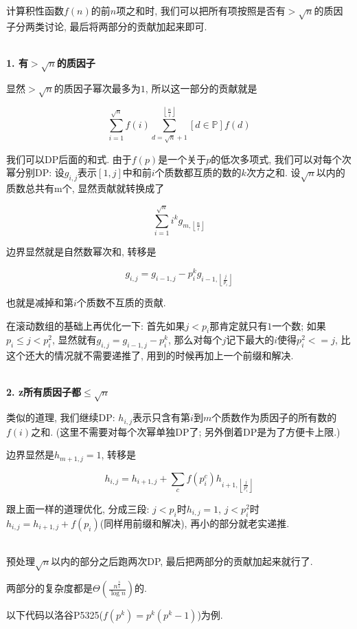 计算积性函数$f(n)$的前$n$项之和时, 我们可以把所有项按照是否有$> \sqrt n$的质因子分两类讨论, 最后将两部分的贡献加起来即可.

~\\

\textbf{1. 有$> \sqrt n$的质因子}

显然$> \sqrt n$的质因子幂次最多为$1$, 所以这一部分的贡献就是

$$ \sum_{i = 1} ^ {\sqrt n} f(i) \sum_{d = \sqrt n + 1} ^ {\left\lfloor \frac n i \right\rfloor} \left[ d \in \mathbb{P} \right] f(d) $$

我们可以DP后面的和式. 由于$f(p)$是一个关于$p$的低次多项式, 我们可以对每个次幂分别DP: 设$g_{i, j}$表示$[1, j]$中和前$i$个质数都互质的数的$k$次方之和. 设$\sqrt n$以内的质数总共有m个, 显然贡献就转换成了

$$ \sum_{i = 1} ^ {\sqrt n} i ^ k g_{m, \left\lfloor \frac n i \right\rfloor} $$

边界显然就是自然数幂次和, 转移是

$$ g_{i, j} = g_{i - 1, j} - p_i ^ k g_{i - 1, \left\lfloor \frac j {p_i} \right\rfloor} $$

也就是减掉和第$i$个质数不互质的贡献.

在滚动数组的基础上再优化一下: 首先如果$j < p_i$那肯定就只有$1$一个数; 如果$p_i \le j < p_i ^ 2$, 显然就有$g_{i, j} = g_{i - 1, j} - p_i ^ k$, 那么对每个$j$记下最大的$i$使得$p_i ^ 2 <= j$, 比这个还大的情况就不需要递推了, 用到的时候再加上一个前缀和解决.

~\\

\textbf{2. z所有质因子都$\le \sqrt n$}

类似的道理, 我们继续DP: $h_{i, j}$表示只含有第$i$到$m$个质数作为质因子的所有数的$f(i)$之和. (这里不需要对每个次幂单独DP了; 另外倒着DP是为了方便卡上限.)

边界显然是$h_{m + 1, j} = 1$, 转移是

$$ h_{i, j} = h_{i + 1, j} + \sum_{c} f(p_i ^ c) h_{i + 1, \left\lfloor \frac j {p_i ^ c} \right\rfloor} $$

跟上面一样的道理优化, 分成三段: $j < p_i$时$h_{i, j} = 1$, $j < p_i ^ 2$时$h_{i, j} = h_{i + 1, j} + f(p_i)$(同样用前缀和解决), 再小的部分就老实递推.

~\\

预处理$\sqrt n$以内的部分之后跑两次DP, 最后把两部分的贡献加起来就行了.

两部分的复杂度都是$\Theta \left( \frac {n ^ {\frac 3 4}} {\log n} \right)$的.

以下代码以洛谷P5325($f(p^k) = p^k (p^k - 1)$)为例.

\inputminted{cpp}{../src/numbertheory/洲阁筛.cpp}